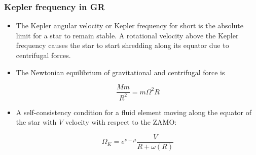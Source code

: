 \begin{frame}
\frametitle{Kepler frequency in GR}

\begin{itemize}
	\item The Kepler angular velocity or Kepler frequency for short is the absolute limit for a star to remain stable. A rotational velocity above the Kepler frequency causes the star to start shredding along its equator due to centrifugal forces.
	\item The Newtonian equilibrium of gravitational and centrifugal force is
	\begin{block}{}
		\begin{equation} \label{eq:1}
			\frac{M m}{R^{2}}
			=
			m \Omega^{2} R
		\end{equation}
	\end{block}
	\item A self-consistency condition for a fluid element moving along the equator of the star with $V$ velocity with respect to the ZAMO:
	\begin{block}{}
		\begin{equation} \label{eq:2}
			\Omega_{K}
			=
			e^{\nu - \mu} \frac{V}{R + \omega (R)}
		\end{equation}
	\end{block}
\end{itemize}

\end{frame}